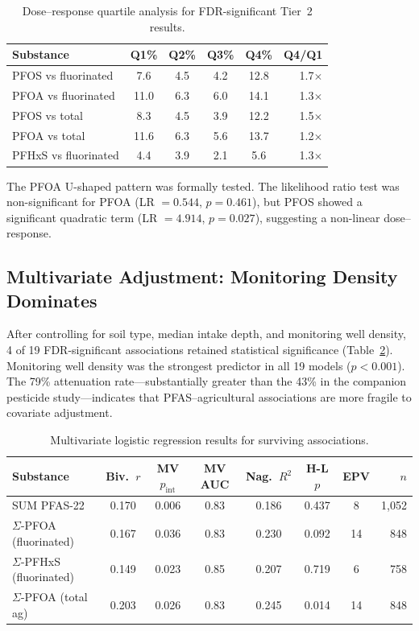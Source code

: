 \documentclass[12pt,a4paper]{article}
\begin{document}
\begin{table}[H]
\centering
\caption{Dose--response quartile analysis for FDR-significant Tier~2 results.}
\label{tab:doseresponse}
\footnotesize
\begin{tabular}{@{}lccccr@{}}
\toprule
Substance & Q1\% & Q2\% & Q3\% & Q4\% & Q4/Q1 \\
\midrule
PFOS vs fluorinated & 7.6 & 4.5 & 4.2 & 12.8 & 1.7$\times$ \\
PFOA vs fluorinated & 11.0 & 6.3 & 6.0 & 14.1 & 1.3$\times$ \\
PFOS vs total & 8.3 & 4.5 & 3.9 & 12.2 & 1.5$\times$ \\
PFOA vs total & 11.6 & 6.3 & 5.6 & 13.7 & 1.2$\times$ \\
PFHxS vs fluorinated & 4.4 & 3.9 & 2.1 & 5.6 & 1.3$\times$ \\
\bottomrule
\end{tabular}
\end{table}

The PFOA U-shaped pattern was formally tested. The likelihood ratio test was non-significant for PFOA (LR $= 0.544$, $p = 0.461$), but PFOS showed a significant quadratic term (LR $= 4.914$, $p = 0.027$), suggesting a non-linear dose--response.

\subsection{Multivariate Adjustment: Monitoring Density Dominates}

After controlling for soil type, median intake depth, and monitoring well density, 4 of 19 FDR-significant associations retained statistical significance (Table~\ref{tab:multivariate}). Monitoring well density was the strongest predictor in all 19 models ($p < 0.001$). The 79\% attenuation rate---substantially greater than the 43\% in the companion pesticide study---indicates that PFAS--agricultural associations are more fragile to covariate adjustment.

\begin{table}[H]
\centering
\caption{Multivariate logistic regression results for surviving associations.}
\label{tab:multivariate}
\footnotesize
\begin{tabular}{@{}lccccccr@{}}
\toprule
Substance & Biv.\ $r$ & MV $p_{\text{int}}$ & MV AUC & Nag.\ $R^2$ & H-L $p$ & EPV & $n$ \\
\midrule
SUM PFAS-22 & 0.170 & 0.006 & 0.83 & 0.186 & 0.437 & 8 & 1,052 \\
$\Sigma$-PFOA (fluorinated) & 0.167 & 0.036 & 0.83 & 0.230 & 0.092 & 14 & 848 \\
$\Sigma$-PFHxS (fluorinated) & 0.149 & 0.023 & 0.85 & 0.207 & 0.719 & 6 & 758 \\
$\Sigma$-PFOA (total ag) & 0.203 & 0.026 & 0.83 & 0.245 & 0.014 & 14 & 848 \\
\bottomrule
\end{tabular}
\end{table}
\end{document}
